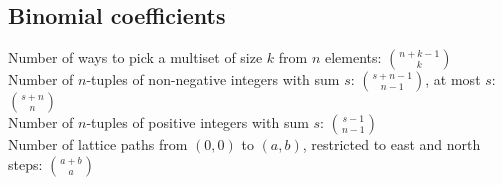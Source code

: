 \documentclass[12pt]{extarticle}
\begin{document}
\begin{multicols*}{2}

\subsection{Binomial coefficients}

\iffalse
\begin{tabular}{r|rrrrrrrrrrrrr}
    & $0$ & $1$ & $2$ & $3$ & $4$ & $5$ & $6$ & $7$ & $8$ & $9$ & $10$ & $11$ & $12$ \\
    \hline
    $0$ & $1$\\
    $1$ & $1$ & $1$\\
    $2$ & $1$ & $2$ & $1$\\
    $3$ & $1$ & $3$ & $3$ & $1$\\
    $4$ & $1$ & $4$ & $6$ & $4$ & $1$\\
    $5$ & $1$ & $5$ & $10$ & $10$ & $5$ & $1$\\
    $6$ & $1$ & $6$ & $15$ & $20$ & $15$ & $6$ & $1$\\
    $7$ & $1$ & $7$ & $21$ & $35$ & $35$ & $21$ & $7$ & $1$\\
    $8$ & $1$ & $8$ & $28$ & $56$ & $70$ & $56$ & $28$ & $8$ & $1$\\
    $9$ & $1$ & $9$ & $36$ & $84$ & $126$ & $126$ & $84$ & $36$ & $9$ & $1$\\
    $10$ & $1$ & $10$ & $45$ & $120$ & $210$ & $252$ & $210$ & $120$ & $45$ & $10$ & $1$\\
    $11$ & $1$ & $11$ & $55$ & $165$ & $330$ & $462$ & $462$ & $330$ & $165$ & $55$ & $11$ & $1$\\
    $12$ & $1$ & $12$ & $66$ & $220$ & $495$ & $792$ & $924$ & $792$ & $495$ & $220$ & $66$ & $12$ & $1$ \\
    \hline
    & $0$ & $1$ & $2$ & $3$ & $4$ & $5$ & $6$ & $7$ & $8$ & $9$ & $10$ & $11$ & $12$
\end{tabular}
\fi

Number of ways to pick a multiset of size $k$ from $n$ elements: ${n+k-1 \choose k}$ \\
Number of $n$-tuples of non-negative integers with sum $s$:
${{s+n-1} \choose {n-1}}$, at most $s$: ${{s + n} \choose {n}}$ \\
Number of $n$-tuples of positive integers with sum $s$:
${{s-1} \choose {n-1}}$ \\
Number of lattice paths from $(0,0)$ to $(a,b)$, restricted to east and north
steps: ${a+b \choose a}$



\end{multicols*}
\end{document}
